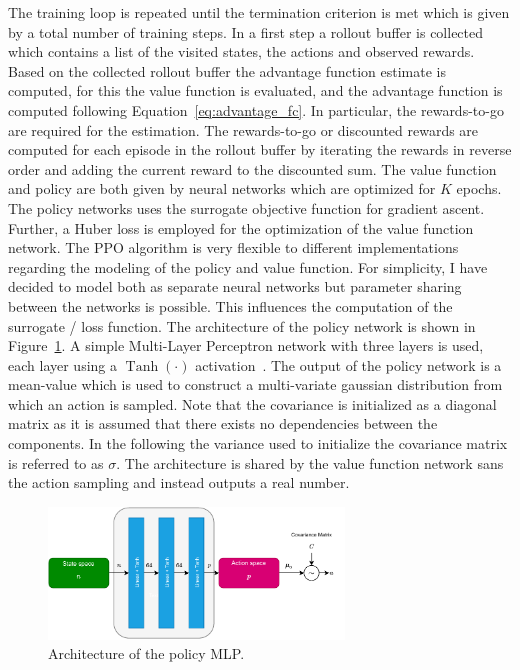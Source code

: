 The training loop is repeated until the termination criterion is met which is given by a total number of training steps.
In a first step a rollout buffer is collected which contains a list of the visited states, the actions and observed rewards.
Based on the collected rollout buffer the advantage function estimate is computed, for this the value function is evaluated,
and the advantage function is computed following Equation~\ref{eq:advantage_fc}.
In particular, the rewards-to-go are required for the estimation.
The rewards-to-go or discounted rewards are computed for each episode in the rollout buffer by iterating the rewards
in reverse order and adding the current reward to the discounted sum.
The value function and policy are both given by neural networks which are optimized for $K$ epochs.
The policy networks uses the surrogate objective function for gradient ascent.
Further, a Huber loss is employed for the optimization of the value function network.
The PPO algorithm is very flexible to different implementations regarding the modeling of the policy and value function.
For simplicity, I have decided to model both as separate neural networks but parameter sharing between the networks is possible.
This influences the computation of the surrogate / loss function.
The architecture of the policy network is shown in Figure~\ref{fig:policy_mlp}.
A simple Multi-Layer Perceptron network with three layers is used, each layer using a $\operatorname{Tanh}(\cdot)$ activation~\cite{Goodfellow-et-al-2016}.
The output of the policy network is a mean-value which is used to construct a multi-variate gaussian distribution from which an action is sampled.
Note that the covariance is initialized as a diagonal matrix as it is assumed that there exists no dependencies between
the components.
In the following the variance used to initialize the covariance matrix is referred to as $\sigma$.
The architecture is shared by the value function network sans the action sampling and instead outputs a real number.
\begin{figure}[h]
    \centering
    \includegraphics[width=0.7\textwidth]{images/presentation/ann_policy_value.pdf}
    \caption{Architecture of the policy MLP.}
    \label{fig:policy_mlp}
\end{figure}
